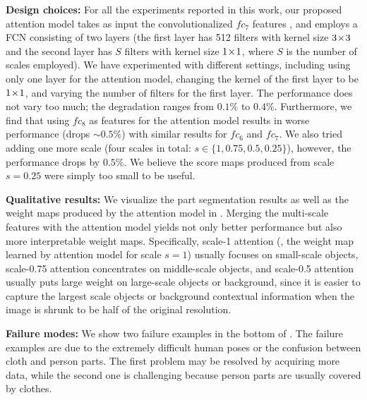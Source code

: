 \textbf{Design choices:} For all the experiments reported in this work, our proposed attention model takes as input the convolutionalized $fc_7$ features \cite{simonyan2014very}, and employs a FCN consisting of two layers (the first layer has 512 filters with kernel size $3 \! \times \! 3$ and the second layer has $S$ filters with kernel size $1 \! \times \! 1$, where $S$ is the number of scales employed). We have experimented with different settings, including using only one layer for the attention model,
changing the kernel of the first layer to be $1 \! \times \! 1$, and varying the number of filters for the first layer. The performance does not vary too much; the degradation ranges from $0.1 \%$ to $0.4 \%$. Furthermore, we find that using $fc_8$ as features for the attention model results in worse performance (drops $\sim 0.5\%$) with similar results for $fc_6$ and $fc_7$. We also tried adding one more scale (four scales in total: $s \in \{1, 0.75, 0.5, 0.25\}$), however,
the performance drops by $0.5 \%$. We believe the score maps produced from scale $s=0.25$ were simply too small to be useful.

\textbf{Qualitative results:} We visualize the part segmentation results as well as the weight maps produced by the attention model in . Merging the multi-scale features with the attention model yields not only better performance but also more interpretable weight maps. Specifically, scale-1 attention (\ie, the weight map learned by attention model for scale $s=1$) usually focuses on small-scale objects, scale-0.75 attention concentrates on middle-scale objects, and scale-0.5 attention usually puts large weight on large-scale objects or background, since it is easier to capture the largest scale objects or background contextual information when the image is shrunk to be half of the original resolution.

\textbf{Failure modes:} We show two failure examples in the bottom of . The failure examples are due to the extremely difficult human poses or the confusion between cloth and person parts. The first problem may be resolved by acquiring more data, while the second one is challenging because person parts are usually covered by clothes.

